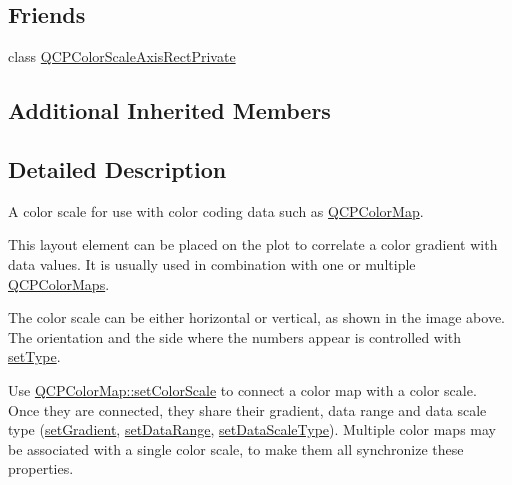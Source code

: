 \subsection*{Friends}
\begin{DoxyCompactItemize}
\item 
class \hyperlink{class_q_c_p_color_scale_a1441d8c09d7227c0c29a8d0a96d55bfe}{Q\+C\+P\+Color\+Scale\+Axis\+Rect\+Private}
\end{DoxyCompactItemize}
\subsection*{Additional Inherited Members}


\subsection{Detailed Description}
A color scale for use with color coding data such as \hyperlink{class_q_c_p_color_map}{Q\+C\+P\+Color\+Map}. 

This layout element can be placed on the plot to correlate a color gradient with data values. It is usually used in combination with one or multiple \hyperlink{class_q_c_p_color_map}{Q\+C\+P\+Color\+Maps}.



The color scale can be either horizontal or vertical, as shown in the image above. The orientation and the side where the numbers appear is controlled with \hyperlink{class_q_c_p_color_scale_a1bf9bdb291927c422dd66b404b206f1f}{set\+Type}.

Use \hyperlink{class_q_c_p_color_map_aa828921db364fe3c6af4619580ab85fd}{Q\+C\+P\+Color\+Map\+::set\+Color\+Scale} to connect a color map with a color scale. Once they are connected, they share their gradient, data range and data scale type (\hyperlink{class_q_c_p_color_scale_a1f29583bb6f1e7f473b62fb712be3940}{set\+Gradient}, \hyperlink{class_q_c_p_color_scale_abe88633003a26d1e756aa74984587fef}{set\+Data\+Range}, \hyperlink{class_q_c_p_color_scale_aeb6107d67dd7325145b2498abae67fc3}{set\+Data\+Scale\+Type}). Multiple color maps may be associated with a single color scale, to make them all synchronize these properties.

